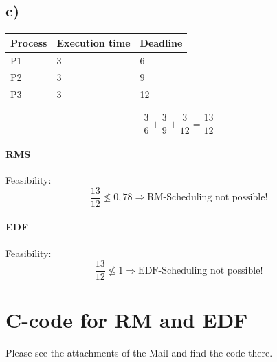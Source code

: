\documentclass[a4paper,10pt]{scrartcl}
\begin{document}
\subsection{c)}
\begin{center}
\begin{tabular}{|l|l|l|}
\hline
\textbf{Process} & \textbf{Execution time} & \textbf{Deadline} \\ 
\hline 
P1 & 3 & 6 \\ 
 
P2 & 3 & 9 \\

P3 & 3 & 12 \\
\hline
\end{tabular} 
\end{center}
$$ \dfrac{3}{6}+ \dfrac{3}{9} + \dfrac{3}{12} = \dfrac{13}{12} $$

\paragraph{RMS}
Feasibility:
$$ \dfrac{13}{12} \nleq 0,78 \Rightarrow \textrm{RM-Scheduling not possible!} $$
\paragraph{EDF}
Feasibility:
$$ \dfrac{13}{12} \nleq 1 \Rightarrow \textrm{EDF-Scheduling not possible!} $$
\section{C-code for RM and EDF}
Please see the attachments of the Mail and find the code there.
\end{document}
